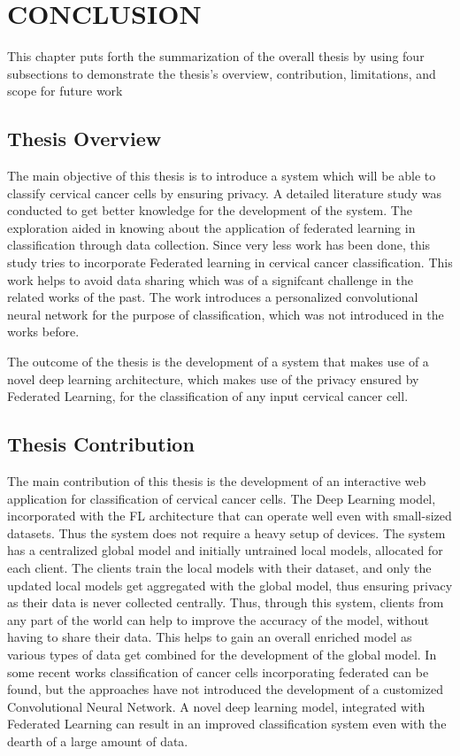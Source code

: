 \chapter{CONCLUSION}\label{conclusion}


This chapter puts forth the summarization of the overall thesis by using four subsections to demonstrate the thesis’s overview, contribution, limitations, and scope for future work

\section{Thesis Overview}
The main objective of this thesis is to introduce a system which will be able to classify cervical cancer cells by ensuring privacy. A detailed literature study was conducted to get better knowledge for the development of the system. The exploration aided in knowing about the application of federated learning in classification through data collection. Since very less work has been done, this study tries to incorporate Federated learning in cervical cancer classification. This work helps to avoid data sharing which was of a signifcant challenge in the related works of the past. The work introduces a personalized convolutional neural network for the purpose of classification, which was not introduced in the works before. 

The outcome of the thesis is the development of a system that makes use of a novel deep learning architecture, which makes use of the privacy ensured by Federated Learning, for the classification of any input cervical cancer cell.

\section{Thesis Contribution}
The main contribution of this thesis is the development of an interactive web application for classification of cervical cancer cells. The Deep Learning model, incorporated with the FL architecture that can operate well even with small-sized datasets. Thus the system does not require a heavy setup of devices. The system has a centralized global model and initially untrained local models, allocated for each client. The clients train the local models with their dataset, and only the updated local models get aggregated with the global model, thus ensuring privacy as their data is never collected centrally. Thus, through this system, clients from any part of the world can help to improve the accuracy of the model, without having to share their data. This helps to gain an overall enriched model as various types of data get combined for the development of the global model.
In some recent works classification of cancer cells incorporating federated can be found, but the approaches have not introduced the development of a customized Convolutional Neural Network. A novel deep learning model, integrated with Federated Learning can result in an improved classification system even with the dearth of a large amount of data.

